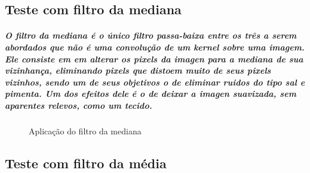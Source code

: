 \documentclass[12pt,fleqn]{article}
\begin{document}
  \subsection{Teste com filtro da mediana}

      \subparagraph{\normalfont O filtro da mediana é o único filtro passa-baixa entre os três a serem abordados que não é uma convolução de um kernel sobre uma imagem. 
      Ele consiste em em alterar os pixels da imagen para a mediana de sua vizinhança, eliminando pixels que distoem muito de seus pixels vizinhos, sendo um 
      de seus objetivos o de eliminar ruidos do tipo sal e pimenta. Um dos efeitos dele é o de deixar a imagen suavizada, sem aparentes relevos, como um tecido.}

      \begin{figure}[!htb]
      \centering
      \caption{Aplicação do filtro da mediana}
      \label{fig:Resultado 1}
      \end{figure}

  \subsection{Teste com filtro da média}
\end{document}
